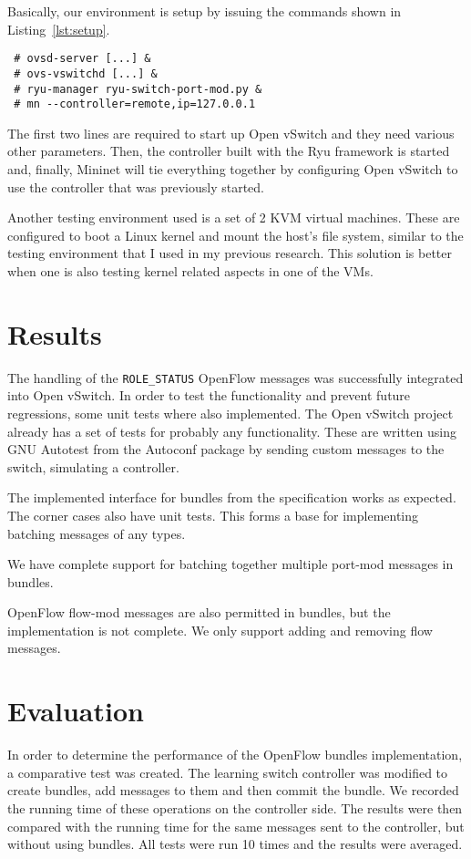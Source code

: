 Basically, our environment is setup by issuing the commands shown in Listing~\ref{lst:setup}.
\lstset{caption=Setting up the Development Environment,label=lst:setup}
\begin{lstlisting}
 # ovsd-server [...] &
 # ovs-vswitchd [...] &
 # ryu-manager ryu-switch-port-mod.py &
 # mn --controller=remote,ip=127.0.0.1
\end{lstlisting}
The first two lines are required to start up Open vSwitch and they need various other parameters.
Then, the controller built with the Ryu framework is started and, finally, Mininet will tie
everything together by configuring Open vSwitch to use the controller that was previously started.

Another testing environment used is a set of 2 KVM virtual machines. These are configured to
boot a Linux kernel and mount the host's file system, similar to the testing environment that
I used in my previous research. This solution is better when one is also testing kernel related
aspects in one of the VMs.

\section{Results}

The handling of the \texttt{ROLE_STATUS} OpenFlow messages was successfully integrated into Open vSwitch.
In order to test the functionality and prevent future regressions, some unit tests
where also implemented. The Open vSwitch project already has a set of tests for probably
any functionality. These are written using GNU Autotest from the Autoconf\cite{autoconf}
package by sending custom messages to the switch, simulating a controller.

The implemented interface for bundles from the specification works as expected. The corner cases also
have unit tests. This forms a base for implementing batching messages of any types.

We have complete support for batching together multiple port-mod messages in bundles.

OpenFlow flow-mod messages are also permitted in bundles, but the implementation is not complete.
We only support adding and removing flow messages.


\section{Evaluation}

In order to determine the performance of the OpenFlow bundles implementation, a comparative test
was created. The learning switch controller was modified to create bundles, add messages to them
and then commit the bundle. We recorded the running time of these operations on the controller side.
The results were then compared with the running time for the same messages sent to the controller,
but without using bundles. All tests were run 10 times and the results were averaged.

